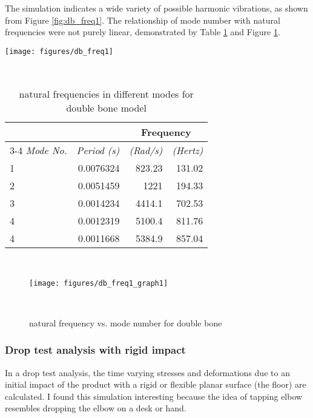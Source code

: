 \documentclass{sigchi}
\begin{document}
The simulation indicates a wide variety of possible harmonic vibrations, as shown from Figure \ref{fig:db_freq1}. The relationship of mode number with natural frequencies were not purely linear, demonstrated by Table \ref{tab:db_freq} and Figure \ref{fig:db_freq1_graph1}.

\begin{figure*}
  \centering
  \texttt{[image: figures/db\_freq1]}
  \caption{natural frequency analysis for double bone}
    ~\label{fig:db_freq1}
\end{figure*}

\begin{table}
  \centering
  \begin{tabular}{l r r r}
    & & \multicolumn{2}{c}{\small{\textbf{Frequency}}} \\
    \cmidrule(r){3-4}
    {\small\textit{Mode No.}}
    & {\small \textit{Period (s)}}
      & {\small \textit{(Rad/s)}}
    & {\small \textit{(Hertz)}} \\
    \midrule
    1 & 0.0076324 & 823.23 & 131.02 \\
    2 & 0.0051459 & 1221 & 194.33 \\
    3 & 0.0014234 & 4414.1 & 702.53 \\
    4 & 0.0012319 & 5100.4 & 811.76 \\
    4 & 0.0011668 & 5384.9 & 857.04 \\
  \end{tabular}
  \caption{natural frequencies in different modes for double bone model}~\label{tab:db_freq}
\end{table}

\begin{figure}
\centering
  \texttt{[image: figures/db\_freq1\_graph1]}
  \caption{natural frequency vs. mode number for double bone}~\label{fig:db_freq1_graph1}
\end{figure}


\subsubsection{Drop test analysis with rigid impact}

In a drop test analysis, the time varying stresses and deformations due to an initial impact of the product with a rigid or flexible planar surface (the floor) are calculated. I found this simulation interesting because the idea of tapping elbow resembles dropping the elbow on a desk or hand. 
\end{document}
